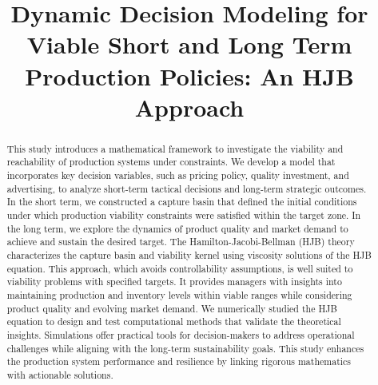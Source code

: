 \documentclass[]{interact}
\theoremstyle{plain}%
\theoremstyle{definition}
\theoremstyle{remark}
\begin{document}

\title{Dynamic Decision Modeling for Viable Short and Long Term Production Policies: An HJB Approach}

\author{
}

\maketitle

\begin{abstract}
This study introduces a mathematical framework to investigate the viability and reachability of production systems under constraints. We develop a model that incorporates key decision variables, such as pricing policy, quality investment, and advertising, to analyze short-term tactical decisions and long-term strategic outcomes.
In the short term, we constructed a capture basin that defined the initial conditions under which production viability constraints were satisfied within the target zone. In the long term, we explore the dynamics of product quality and market demand to achieve and sustain the desired target. The Hamilton-Jacobi-Bellman (HJB) theory characterizes the capture basin and viability kernel using viscosity solutions of the HJB equation. This approach, which avoids controllability assumptions, is well suited to viability problems with specified targets. It provides managers with insights into maintaining production and inventory levels within viable ranges while considering product quality and evolving market demand.
We numerically studied the HJB equation to design and test computational methods that validate the theoretical insights. Simulations offer practical tools for decision-makers to address operational challenges while aligning with the long-term sustainability goals. This study enhances the production system performance and resilience by linking rigorous mathematics with actionable solutions.
\end{abstract}
\end{document}
